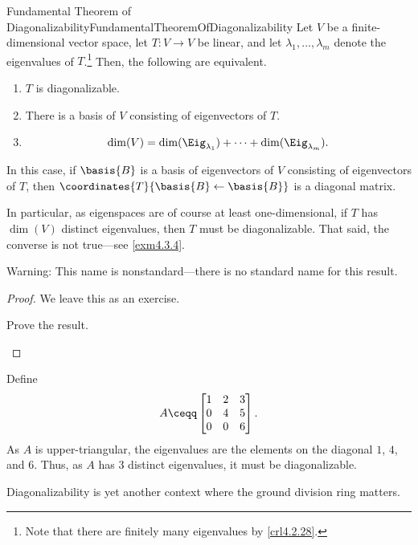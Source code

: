\begin{thm}{Fundamental Theorem of Diagonalizability}{FundamentalTheoremOfDiagonalizability}
	Let $V$ be a finite-dimensional vector space, let $T\colon V\rightarrow V$ be linear, and let $\lambda _1,\ldots ,\lambda _m$ denote the eigenvalues of $T$.\footnote{Note that there are finitely many eigenvalues by \cref{crl4.2.28}.}  Then, the following are equivalent.
	\begin{enumerate}
		\item $T$ is diagonalizable.
		\item There is a basis of $V$ consisting of eigenvectors of $T$.
		\item
		\begin{equation}
			\dim (V)=\dim (\Eig _{\lambda _1})+\cdots +\dim (\Eig _{\lambda _m}).
		\end{equation}
	\end{enumerate}
	In this case, if $\basis{B}$ is a basis of eigenvectors of $V$ consisting of eigenvectors of $T$, then $\coordinates{T}{\basis{B}\leftarrow \basis{B}}$ is a diagonal matrix.
	\begin{rmk}
		In particular, as eigenspaces are of course at least one-dimensional, if $T$ has $\dim (V)$ distinct eigenvalues, then $T$ must be diagonalizable.  That said, the converse is not true---see \cref{exm4.3.4}.
	\end{rmk}
	\begin{rmk}
		Warning:  This name is nonstandard---there is no standard name for this result.
	\end{rmk}
	\begin{proof}
		We leave this as an exercise.
		\begin{exr}[breakable=false]{}{}
			Prove the result.
		\end{exr}
	\end{proof}
\end{thm}
\begin{exm}{}{}
	Define
	\begin{equation}
		A\ceqq \begin{bmatrix}1 & 2 & 3 \\ 0 & 4 & 5 \\ 0 & 0 & 6\end{bmatrix}.
	\end{equation}
	As $A$ is upper-triangular, the eigenvalues are the elements on the diagonal  $1$, $4$, and $6$.  Thus, as $A$ has $3$ distinct eigenvalues, it must be diagonalizable.
\end{exm}
Diagonalizability is yet another context where the ground division ring matters.
